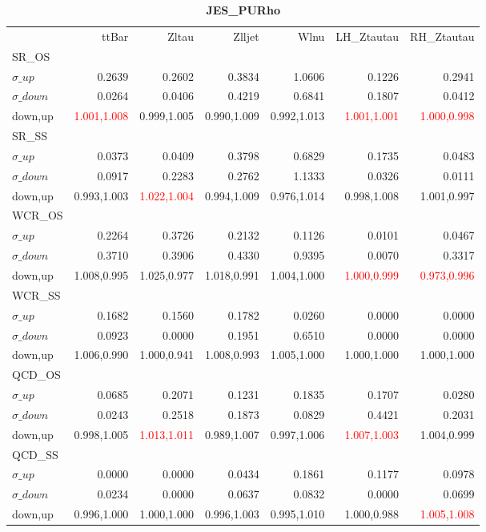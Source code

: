 \documentclass[11pt,oneside,a4paper]{article}
\begin{document}
\begin{table}
\centering
\caption{\bf{JES\_PURho}}
\begin{tabular}{lrrrrrr}
 & ttBar & Zltau & Zlljet & Wlnu & LH\_Ztautau & RH\_Ztautau \\
SR\_OS &  &  &  &  &  &  \\
$\sigma\_up$ & 0.2639 & 0.2602 & 0.3834 & 1.0606 & 0.1226 & 0.2941 \\
$\sigma\_down$ & 0.0264 & 0.0406 & 0.4219 & 0.6841 & 0.1807 & 0.0412 \\
down,up & \textcolor{red}{1.001,1.008} & 0.999,1.005 & 0.990,1.009 & 0.992,1.013 & \textcolor{red}{1.001,1.001} & \textcolor{red}{1.000,0.998} \\

\hline
SR\_SS &  &  &  &  &  &  \\
$\sigma\_up$ & 0.0373 & 0.0409 & 0.3798 & 0.6829 & 0.1735 & 0.0483 \\
$\sigma\_down$ & 0.0917 & 0.2283 & 0.2762 & 1.1333 & 0.0326 & 0.0111 \\
down,up & 0.993,1.003 & \textcolor{red}{1.022,1.004} & 0.994,1.009 & 0.976,1.014 & 0.998,1.008 & 1.001,0.997 \\

\hline
WCR\_OS &  &  &  &  &  &  \\
$\sigma\_up$ & 0.2264 & 0.3726 & 0.2132 & 0.1126 & 0.0101 & 0.0467 \\
$\sigma\_down$ & 0.3710 & 0.3906 & 0.4330 & 0.9395 & 0.0070 & 0.3317 \\
down,up & 1.008,0.995 & 1.025,0.977 & 1.018,0.991 & 1.004,1.000 & \textcolor{red}{1.000,0.999} & \textcolor{red}{0.973,0.996} \\

\hline
WCR\_SS &  &  &  &  &  &  \\
$\sigma\_up$ & 0.1682 & 0.1560 & 0.1782 & 0.0260 & 0.0000 & 0.0000 \\
$\sigma\_down$ & 0.0923 & 0.0000 & 0.1951 & 0.6510 & 0.0000 & 0.0000 \\
down,up & 1.006,0.990 & 1.000,0.941 & 1.008,0.993 & 1.005,1.000 & 1.000,1.000 & 1.000,1.000 \\

\hline
QCD\_OS &  &  &  &  &  &  \\
$\sigma\_up$ & 0.0685 & 0.2071 & 0.1231 & 0.1835 & 0.1707 & 0.0280 \\
$\sigma\_down$ & 0.0243 & 0.2518 & 0.1873 & 0.0829 & 0.4421 & 0.2031 \\
down,up & 0.998,1.005 & \textcolor{red}{1.013,1.011} & 0.989,1.007 & 0.997,1.006 & \textcolor{red}{1.007,1.003} & 1.004,0.999 \\

\hline
QCD\_SS &  &  &  &  &  &  \\
$\sigma\_up$ & 0.0000 & 0.0000 & 0.0434 & 0.1861 & 0.1177 & 0.0978 \\
$\sigma\_down$ & 0.0234 & 0.0000 & 0.0637 & 0.0832 & 0.0000 & 0.0699 \\
down,up & 0.996,1.000 & 1.000,1.000 & 0.996,1.003 & 0.995,1.010 & 1.000,0.988 & \textcolor{red}{1.005,1.008} \\

\hline
\end{tabular}
\end{table}
\end{document}
